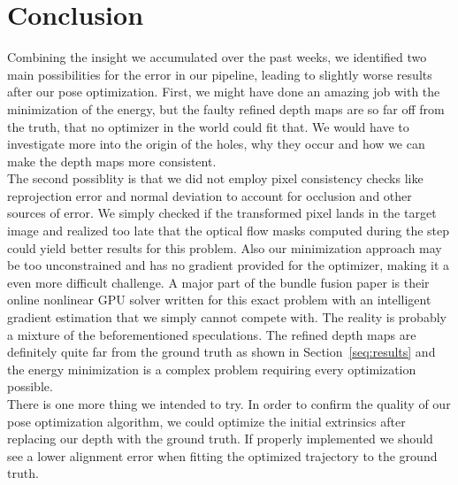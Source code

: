 \chapter{Conclusion}
    Combining the insight we accumulated over the past weeks, we identified two main possibilities for the error in our pipeline, leading to slightly worse results after our pose optimization.
    First, we might have done an amazing job with the minimization of the energy, but the faulty refined depth maps are so far off from the truth, that no optimizer in the world could fit that.
    We would have to investigate more into the origin of the holes, why they occur and how we can make the depth maps more consistent.\\
    The second possiblity is that we did not employ pixel consistency checks like reprojection error and normal deviation to account for occlusion and other sources of error.
    We simply checked if the transformed pixel lands in the target image and realized too late that the optical flow masks computed during the  step could yield better results for this problem.
    Also our minimization approach may be too unconstrained and has no gradient provided for the optimizer, making it a even more difficult challenge.
    A major part of the bundle fusion paper is their online nonlinear GPU solver written for this exact problem with an intelligent gradient estimation that we simply cannot compete with.
    The reality is probably a mixture of the beforementioned speculations.
    The refined depth maps are definitely quite far from the ground truth as shown in Section~\ref{seq:results} and the energy minimization is a complex problem requiring every optimization possible.\\
    There is one more thing we intended to try.
    In order to confirm the quality of our pose optimization algorithm, we could optimize the initial extrinsics after replacing our depth with the ground truth.
    If properly implemented we should see a lower alignment error when fitting the optimized trajectory to the ground truth.